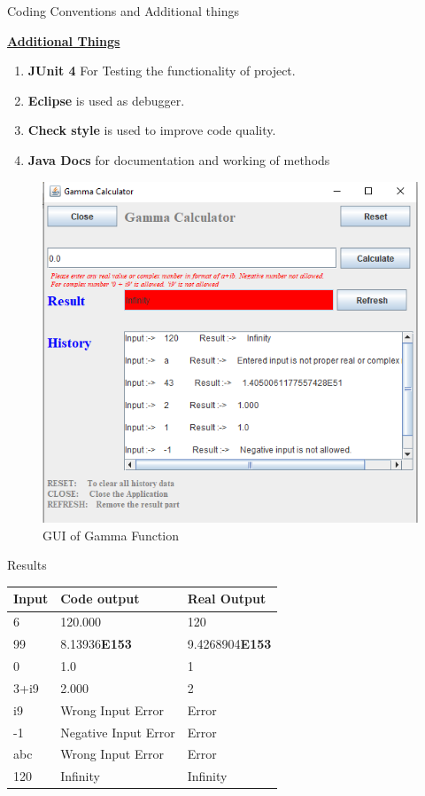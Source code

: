 \documentclass[final]{beamer}
\newlength{\onecolwid}
\newlength{\twocolwid}
\begin{document}
\begin{frame}
\begin{columns}[t]
\begin{column}{\twocolwid}
\begin{columns}[t,totalwidth=\twocolwid]
\begin{column}{\onecolwid}
\begin{exampleblock}{Coding Conventions and Additional things}
{\textbf{\underline{Additional Things}}
\begin{enumerate}
    \item \textbf{JUnit 4} For Testing the functionality of project. 
    \item \textbf{Eclipse} is used as debugger.
    \item \textbf{Check style} is used to improve code quality.
    \item \textbf{Java Docs} for documentation and working of methods
\end{enumerate}}




\end{exampleblock}
\begin{figure}
\includegraphics[width=0.8\linewidth]{img/d4_1.png}
\caption{GUI of Gamma Function}
\label{fig:GUI of Gamma Function}
\end{figure}
\begin{exampleblock}{Results}
\begin{tabular}{|p{5cm}|p{11cm}|p{8cm}|}

 \hline
 Input & Code output &Real Output\\
 \hline
 6  & 120.000  &  120\\
 99  &  8.13936\textbf{E153}  &  9.4268904\textbf{E153}\\
 0  & 1.0  &  1\\
 3+i9  & 2.000  &  2\\
 i9  & Wrong Input Error & Error \\
 -1 & Negative Input Error & Error \\
 abc & Wrong Input Error & Error\\
 120 & Infinity & Infinity \\
 \hline
\end{tabular}
\end{exampleblock}


\end{column}
\end{columns}
\end{column}
\end{columns}
\end{frame}
\end{document}
